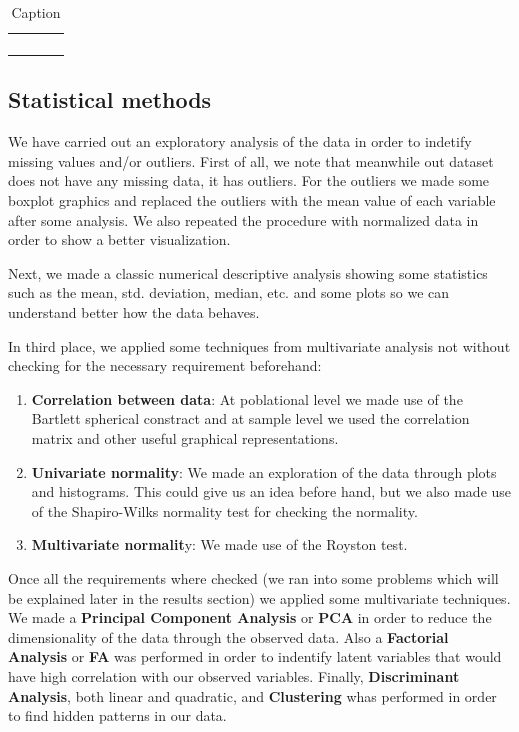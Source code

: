 \documentclass[12pt]{article}
\begin{document}
{    \begin{table}
        \centering
        \begin{tabular}{cccc}
             &  &  & \\
             &  &  & \\
             &  &  & \\
             &  &  & \\
        \end{tabular}
        \caption{Caption}
        \label{tab:my_label}
    \end{table}
        
    \subsection{Statistical methods}
    We have carried out an exploratory analysis of the data in order to indetify missing values and/or outliers. First of all, we note that meanwhile out dataset does not have any missing data, it has outliers. For the outliers we made some boxplot graphics and replaced the outliers with the mean value of each variable after some analysis. We also repeated the procedure with normalized data in order to show a better visualization.

    Next, we made a classic numerical descriptive analysis showing some statistics such as the mean, std. deviation, median, etc. and some plots so we can understand better how the data behaves.

    In third place, we applied some techniques from multivariate analysis not without checking for the necessary requirement beforehand:

    \begin{enumerate}
        \item \textbf{Correlation between data}: At poblational level we made use of the Bartlett spherical constract and at sample level we used the correlation matrix and other useful graphical representations.
        \item \textbf{Univariate normality}: We made an exploration of the data through plots and histograms. This could give us an idea before hand, but we also made use of the Shapiro-Wilks normality test for checking the normality.
        \item \textbf{Multivariate normalit}y: We made use of the Royston test.
    \end{enumerate}

    Once all the requirements where checked (we ran into some problems which will be explained later in the results section) we applied some multivariate techniques. We made a \textbf{Principal Component Analysis} or \textbf{PCA} in order to reduce the dimensionality of the data through the observed data. Also a \textbf{Factorial Analysis} or \textbf{FA} was performed in order to indentify latent variables that would have high correlation with our observed variables. Finally, \textbf{Discriminant Analysis}, both linear and quadratic, and \textbf{Clustering} whas performed in order to find hidden patterns in our data.
}
\end{document}
